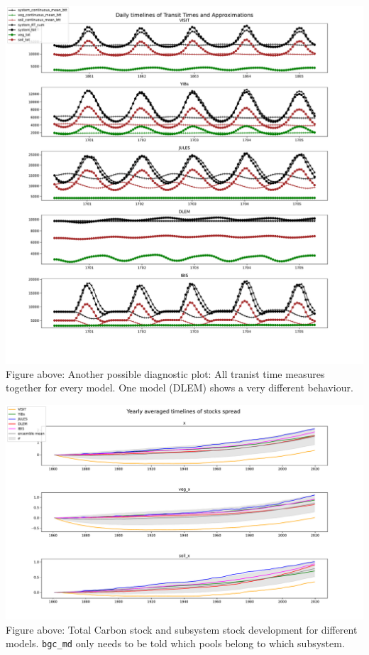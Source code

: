 \documentclass[36pt]{article}
\begin{document}
\begin{tcbposter}
{\begin{multicols}{2}
\begin{center}
	\includegraphics[width=\columnwidth]{test2_fine.pdf}
  Figure above: Another possible diagnostic plot: All tranist time measures together for every model.
  One model (DLEM) shows a very different behaviour.
\end{center}
\begin{center}
	\includegraphics[width=\columnwidth]{test_stock_mean.pdf}
  Figure above: Total Carbon stock and subsystem stock development for different models.
  \texttt{bgc\_md} only needs to be told which pools belong to which subsystem.
\end{center}


\end{multicols}}
\end{tcbposter}
\end{document}
